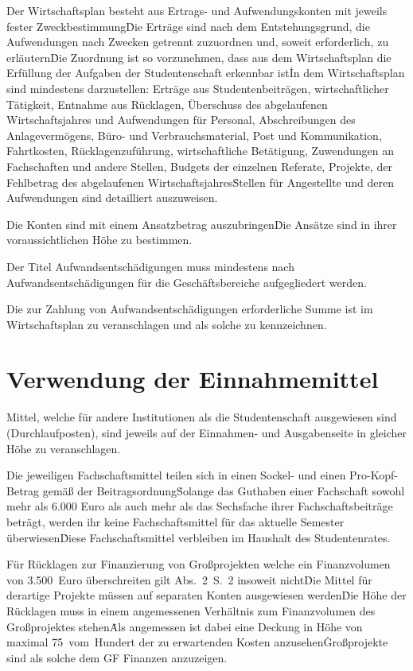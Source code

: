 \begin{multicols}{2}
\Abs \Satz Der Wirtschaftsplan besteht aus Ertrags- und Aufwendungskonten mit jeweils fester Zweckbestimmung\. Die Erträge sind nach dem Entstehungsgrund, die Aufwendungen nach Zwecken getrennt zuzuordnen und, soweit erforderlich, zu erläutern\. Die Zuordnung ist so vorzunehmen, dass aus dem Wirtschaftsplan die Erfüllung der Aufgaben der Studentenschaft erkennbar ist\. In dem Wirtschaftsplan sind mindestens darzustellen: Erträge aus Studentenbeiträgen, wirtschaftlicher Tätigkeit, Entnahme aus Rücklagen, Überschuss des abgelaufenen Wirtschaftsjahres und Aufwendungen für Personal, Abschreibungen des Anlagevermögens, Büro- und Verbrauchsmaterial, Post und Kommunikation, Fahrtkosten, Rücklagenzuführung, wirtschaftliche Betätigung, Zuwendungen an Fachschaften und andere Stellen, Budgets der einzelnen Referate, Projekte, der Fehlbetrag des abgelaufenen Wirtschaftsjahres\. Stellen für Angestellte und deren Aufwendungen sind detailliert auszuweisen.

\Abs \Satz Die Konten sind mit einem Ansatzbetrag auszubringen\. Die Ansätze sind in ihrer voraussichtlichen Höhe zu bestimmen.

\Abs \Satz Der Titel Aufwandsentschädigungen muss mindestens nach Aufwandsentschädigungen für die Geschäftsbereiche aufgegliedert werden.

\Abs \Satz Die zur Zahlung von Aufwandsentschädigungen erforderliche Summe ist im Wirtschaftsplan zu veranschlagen und als solche zu kennzeichnen.



\section{Verwendung der Einnahmemittel}

\Abs \Satz Mittel, welche für andere Institutionen als die Studentenschaft ausgewiesen sind (Durchlaufposten), sind jeweils auf der Einnahmen- und Ausgabenseite in gleicher Höhe zu veranschlagen.

\Abs \Satz Die jeweiligen Fachschaftsmittel teilen sich in einen Sockel- und einen Pro-Kopf-Betrag gemäß der Beitragsordnung\. Solange das Guthaben einer Fachschaft sowohl mehr als 6.000 Euro als auch mehr als das Sechsfache ihrer Fachschaftsbeiträge beträgt, werden ihr keine Fachschaftsmittel für das aktuelle Semester überwiesen\. Diese Fachschaftsmittel verbleiben im Haushalt des Studentenrates.

\Abs \Satz Für Rücklagen zur Finanzierung von Großprojekten welche ein Finanzvolumen von 3.500~Euro überschreiten gilt Abs.~2~S.~2 insoweit nicht\. Die Mittel für derartige Projekte müssen auf separaten Konten ausgewiesen werden\. Die Höhe der Rücklagen muss in einem angemessenen Verhältnis zum Finanzvolumen des Großprojektes stehen\. Als angemessen ist dabei eine Deckung in Höhe von maximal 75~vom~Hundert der zu erwartenden Kosten anzusehen\. Großprojekte sind als solche dem GF Finanzen anzuzeigen.


\end{multicols}
